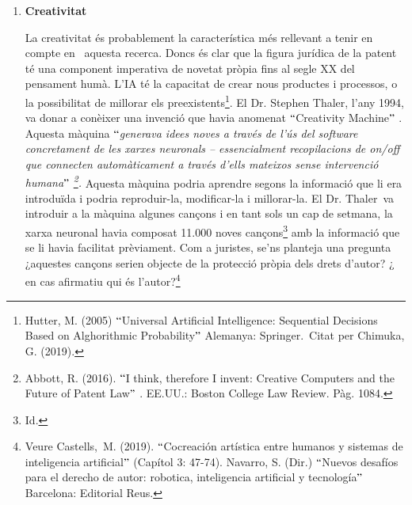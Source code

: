 \documentclass[12pt]{article}
\begin{document}
\vspace{\baselineskip}
\begin{enumerate}
	\item \textbf{Creativitat}\par


\vspace{\baselineskip}
La creativitat és probablement la característica més rellevant a tenir en compte en \  aquesta recerca. Doncs és clar que la figura jurídica de la patent té una component imperativa de novetat pròpia fins al segle XX del pensament humà. L’IA té la capacitat de crear nous productes i processos, o la possibilitat de millorar els preexistents\footnote{ Hutter, M. (2005) $``$Universal Artificial Intelligence: Sequential Decisions Based on Alghorithmic Probability$"$  Alemanya: Springer.\ Citat per  Chimuka, G. (2019). }. El Dr. Stephen Thaler, l’any 1994, va donar a conèixer una invenció que havia anomenat $``$Creativity Machine$"$ . Aquesta màquina $``$\textit{generava idees noves a través de l’ús del software concretament de les xarxes neuronals – essencialment recopilacions de on/off que connecten automàticament a través d’ells mateixos sense intervenció humana$"$ \footnote{ Abbott, R. (2016). $``$I think, therefore I invent: Creative Computers and the Future of Patent Law$"$ . EE.UU.: Boston College Law Review. Pàg. 1084.  }. }Aquesta màquina podria aprendre segons la informació que li era introduïda i podria reproduir-la, modificar-la i millorar-la. El Dr. Thaler\ va introduir a la màquina algunes cançons i en  tant sols un cap de setmana, la xarxa neuronal havia composat 11.000 noves cançons\footnote{ Id. } amb la informació que se li havia facilitat prèviament. Com a juristes, se’ns planteja una pregunta ¿aquestes cançons serien objecte de la protecció pròpia dels drets d’autor? ¿ en cas afirmatiu qui és l’autor?\footnote{ Veure Castells,\ M. (2019).  $``$Cocreación artística entre humanos y sistemas de inteligencia artificial$"$  (Capítol 3: 47-74). Navarro, S. (Dir.) $``$Nuevos desafíos para el derecho de autor: robotica, inteligencia artificial y tecnología$"$  Barcelona: Editorial Reus.  }{\fontsize{10pt}{12.0pt}\selectfont  \par}\par



\end{enumerate}
\end{document}

